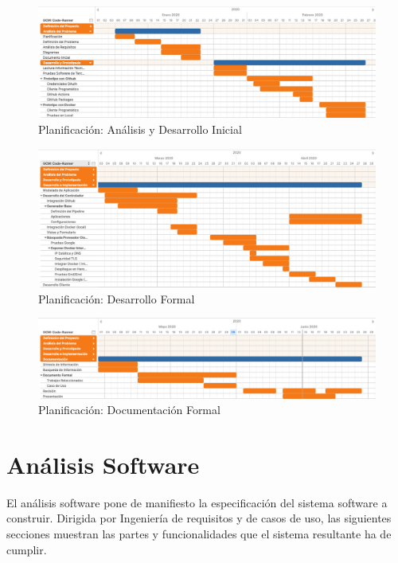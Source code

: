\documentclass[a4paper,11pt]{book}
\begin{document}
\begin{figure}[H]
\centering
\includegraphics[scale=0.20]{imagenes/gant2.png}
\caption{ Planificación: Análisis y Desarrollo Inicial }
\label{p2}
\end{figure}

\begin{figure}[H]
\centering
\includegraphics[scale=0.20]{imagenes/gant3.png}
\caption{ Planificación: Desarrollo Formal}
\label{p3}
\end{figure}

\begin{figure}[H]
\centering
\includegraphics[scale=0.20]{imagenes/gant4.png}
\caption{ Planificación: Documentación Formal}
\label{p4}
\end{figure}



\section{Análisis Software}

El análisis software pone de manifiesto la especificación del sistema software a construir. Dirigida por Ingeniería de requisitos y de casos de uso, las siguientes secciones muestran las partes y funcionalidades que el sistema resultante ha de cumplir.
\end{document}

